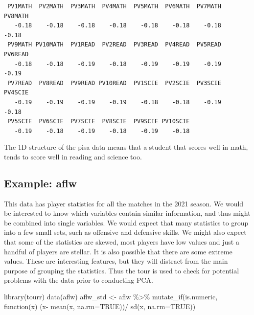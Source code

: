 \documentclass[
  letterpaper,
]{book}
\newenvironment{Shaded}{\begin{snugshade}}{\end{snugshade}}
\newcommand{\AttributeTok}[1]{\textcolor[rgb]{0.40,0.45,0.13}{#1}}
\newcommand{\ConstantTok}[1]{\textcolor[rgb]{0.56,0.35,0.01}{#1}}
\newcommand{\ControlFlowTok}[1]{\textcolor[rgb]{0.00,0.23,0.31}{#1}}
\newcommand{\FunctionTok}[1]{\textcolor[rgb]{0.28,0.35,0.67}{#1}}
\newcommand{\NormalTok}[1]{\textcolor[rgb]{0.00,0.23,0.31}{#1}}
\newcommand{\OtherTok}[1]{\textcolor[rgb]{0.00,0.23,0.31}{#1}}
\newcommand{\SpecialCharTok}[1]{\textcolor[rgb]{0.37,0.37,0.37}{#1}}
\begin{document}
\begin{verbatim}
 PV1MATH  PV2MATH  PV3MATH  PV4MATH  PV5MATH  PV6MATH  PV7MATH  PV8MATH 
   -0.18    -0.18    -0.18    -0.18    -0.18    -0.18    -0.18    -0.18 
 PV9MATH PV10MATH  PV1READ  PV2READ  PV3READ  PV4READ  PV5READ  PV6READ 
   -0.18    -0.18    -0.19    -0.18    -0.19    -0.19    -0.19    -0.19 
 PV7READ  PV8READ  PV9READ PV10READ  PV1SCIE  PV2SCIE  PV3SCIE  PV4SCIE 
   -0.19    -0.19    -0.19    -0.19    -0.18    -0.18    -0.19    -0.18 
 PV5SCIE  PV6SCIE  PV7SCIE  PV8SCIE  PV9SCIE PV10SCIE 
   -0.19    -0.18    -0.19    -0.18    -0.19    -0.18 
\end{verbatim}

The 1D structure of the pisa data means that a student that scores well
in math, tends to score well in reading and science too.

\hypertarget{example-aflw}{%
\subsection{Example: aflw}\label{example-aflw}}

This data has player statistics for all the matches in the 2021 season.
We would be interested to know which variables contain similar
information, and thus might be combined into single variables. We would
expect that many statistics to group into a few small sets, such as
offensive and defensive skills. We might also expect that some of the
statistics are skewed, most players have low values and just a handful
of players are stellar. It is also possible that there are some extreme
values. These are interesting features, but they will distract from the
main purpose of grouping the statistics. Thus the tour is used to check
for potential problems with the data prior to conducting PCA.

\begin{Shaded}
\begin{Highlighting}[]
\FunctionTok{library}\NormalTok{(tourr)}
\FunctionTok{data}\NormalTok{(aflw)}
\NormalTok{aflw\_std }\OtherTok{\textless{}{-}}\NormalTok{ aflw }\SpecialCharTok{\%\textgreater{}\%}
  \FunctionTok{mutate\_if}\NormalTok{(is.numeric, }\ControlFlowTok{function}\NormalTok{(x) (x}\SpecialCharTok{{-}}
      \FunctionTok{mean}\NormalTok{(x, }\AttributeTok{na.rm=}\ConstantTok{TRUE}\NormalTok{))}\SpecialCharTok{/}
      \FunctionTok{sd}\NormalTok{(x, }\AttributeTok{na.rm=}\ConstantTok{TRUE}\NormalTok{))}
\end{Highlighting}
\end{Shaded}
\end{document}
